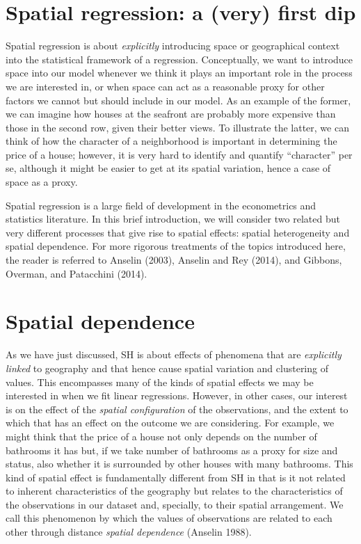 \documentclass[
  letterpaper,
  krantz2]{style/krantz}
\begin{document}
\hypertarget{spatial-regression-a-very-first-dip}{%
\section{Spatial regression: a (very) first
dip}\label{spatial-regression-a-very-first-dip}}

Spatial regression is about \emph{explicitly} introducing space or
geographical context into the statistical framework of a regression.
Conceptually, we want to introduce space into our model whenever we
think it plays an important role in the process we are interested in, or
when space can act as a reasonable proxy for other factors we cannot but
should include in our model. As an example of the former, we can imagine
how houses at the seafront are probably more expensive than those in the
second row, given their better views. To illustrate the latter, we can
think of how the character of a neighborhood is important in determining
the price of a house; however, it is very hard to identify and quantify
``character'' per se, although it might be easier to get at its spatial
variation, hence a case of space as a proxy.

Spatial regression is a large field of development in the econometrics
and statistics literature. In this brief introduction, we will consider
two related but very different processes that give rise to spatial
effects: spatial heterogeneity and spatial dependence. For more rigorous
treatments of the topics introduced here, the reader is referred to
Anselin (2003), Anselin and Rey (2014), and Gibbons, Overman, and
Patacchini (2014).

\hypertarget{spatial-dependence-2}{%
\section{Spatial dependence}\label{spatial-dependence-2}}

As we have just discussed, SH is about effects of phenomena that are
\emph{explicitly linked} to geography and that hence cause spatial
variation and clustering of values. This encompasses many of the kinds
of spatial effects we may be interested in when we fit linear
regressions. However, in other cases, our interest is on the effect of
the \emph{spatial configuration} of the observations, and the extent to
which that has an effect on the outcome we are considering. For example,
we might think that the price of a house not only depends on the number
of bathrooms it has but, if we take number of bathrooms as a proxy for
size and status, also whether it is surrounded by other houses with many
bathrooms. This kind of spatial effect is fundamentally different from
SH in that is it not related to inherent characteristics of the
geography but relates to the characteristics of the observations in our
dataset and, specially, to their spatial arrangement. We call this
phenomenon by which the values of observations are related to each other
through distance \emph{spatial dependence} (Anselin 1988).
\end{document}
